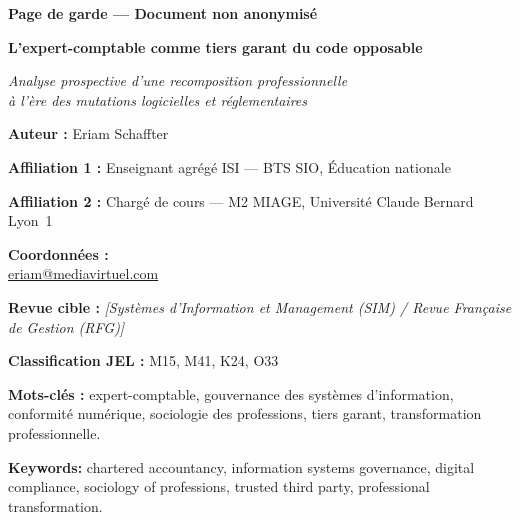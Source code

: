 \documentclass[12pt,a4paper]{article}
\begin{document}
\vspace*{2cm}

\begin{center}

{\Large\bfseries Page de garde --- Document non anonymisé}

\vspace{2cm}

{\LARGE\bfseries L'expert-comptable comme tiers garant du code opposable}

\vspace{0.5em}

{\large\itshape Analyse prospective d'une recomposition professionnelle\\
à l'ère des mutations logicielles et réglementaires}

\vspace{2cm}

\textbf{Auteur :} Eriam Schaffter

\vspace{0.5em}

\textbf{Affiliation 1 :} Enseignant agrégé ISI --- BTS SIO, Éducation nationale

\textbf{Affiliation 2 :} Chargé de cours --- M2 MIAGE, Université Claude Bernard Lyon~1

\vspace{1em}

\textbf{Coordonnées :}\\
\href{mailto:eriam@mediavirtuel.com}{eriam@mediavirtuel.com}

\vspace{2cm}

\textbf{Revue cible :} \textit{[Systèmes d'Information et Management (SIM) / Revue Française de Gestion (RFG)]}

\vspace{1em}

\textbf{Classification JEL :} M15, M41, K24, O33

\vspace{1em}

\textbf{Mots-clés :} expert-comptable, gouvernance des systèmes d'information, conformité numérique, sociologie des professions, tiers garant, transformation professionnelle.

\vspace{1em}

\textbf{Keywords:} chartered accountancy, information systems governance, digital compliance, sociology of professions, trusted third party, professional transformation.


\end{center}
\end{document}
